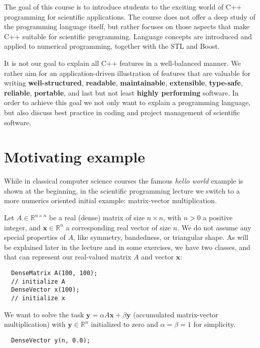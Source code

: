 The goal of this course is to introduce students to the exciting world of C++ programming for scientific applications. The course
does not offer a deep study of the programming language itself, but rather focuses on those aspects that make C++ suitable for
scientific programming. Language concepts are introduced and applied to numerical programming, together with the STL and Boost.

It is not our goal to explain all C++ features in a well-balanced manner. We rather aim for an application-driven illustration of
features that are valuable for writing \textbf{well-structured}, \textbf{readable}, \textbf{maintainable}, \textbf{extensible},
\textbf{type-safe}, \textbf{reliable}, \textbf{portable}, and last but not least \textbf{highly performing} software. In order
to achieve this goal we not only want to explain a programming language, but also discuss best practice in coding and project
management of scientific software.

\section{Motivating example}
While in classical computer science courses the famous \emph{hello world} example is shown at the beginning, in the scientific
programming lecture we switch to a more numerics oriented initial example: matrix-vector multiplication.

Let $A\in\mathbb{R}^{n\times n}$ be a real (dense) matrix of size $n\times n$, with $n > 0$ a positive integer, and $\mathbf{x}\in\mathbb{R}^n$
a corresponding real vector of size $n$. We do not assume any special properties of $A$, like symmetry, bandedness, or triangular
shape. As will be explained later in the lecture and in some exercises, we have two classes,  and 
that can represent our real-valued matrix $A$ and vector $\mathbf{x}$:
%
\begin{verbatim}
  DenseMatrix A(100, 100);
  // initialize A
  DenseVector x(100);
  // initialize x
\end{verbatim}

We want to solve the task $\mathbf{y} = \alpha A\mathbf{x} + \beta \mathbf{y}$ (accumulated matrix-vector multiplication) with
$\mathbf{y}\in\mathbb{R}^n$ initialized to zero and $\alpha=\beta=1$ for simplicity.
%
\begin{verbatim}
  DenseVector y(n, 0.0);
\end{verbatim}

